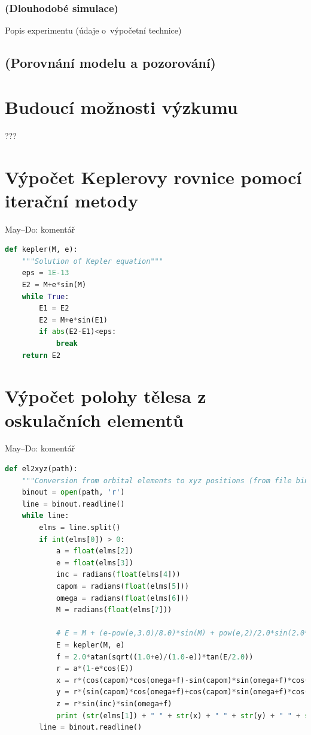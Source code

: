 \documentclass[A4paper, 12pt, oneside]{book}%
\begin{document}
\subsection{(Dlouhodobé simulace)}
Popis experimentu (údaje o~výpočetní technice)
\section{(Porovnání modelu a pozorování)}

\chapter{Budoucí možnosti výzkumu}
???

\newpage

\printbibliography

\begin{appendices}
	\chapter{Výpočet Keplerovy rovnice pomocí iterační metody} \label{app:kepit}
	May--Do: komentář
\begin{lstlisting}[language=Python]
def kepler(M, e):
    """Solution of Kepler equation"""
    eps = 1E-13
    E2 = M+e*sin(M)
    while True:
        E1 = E2
        E2 = M+e*sin(E1)
        if abs(E2-E1)<eps:
            break 
    return E2
\end{lstlisting}
	\chapter{Výpočet polohy tělesa z oskulačních elementů} \label{app:el2xyz}
	May--Do: komentář
	\begin{lstlisting}[language=Python]
def el2xyz(path):
    """Conversion from orbital elements to xyz positions (from file bin.out by script follow2)"""
    binout = open(path, 'r')
    line = binout.readline()
    while line:
        elms = line.split()
        if int(elms[0]) > 0:
            a = float(elms[2])
            e = float(elms[3])
            inc = radians(float(elms[4]))
            capom = radians(float(elms[5]))
            omega = radians(float(elms[6]))
            M = radians(float(elms[7]))
    
            # E = M + (e-pow(e,3.0)/8.0)*sin(M) + pow(e,2)/2.0*sin(2.0*M) + pow(e,3)*3.0/8.0*sin(3.0*M)
            E = kepler(M, e)
            f = 2.0*atan(sqrt((1.0+e)/(1.0-e))*tan(E/2.0))
            r = a*(1-e*cos(E))
            x = r*(cos(capom)*cos(omega+f)-sin(capom)*sin(omega+f)*cos(inc))
            y = r*(sin(capom)*cos(omega+f)+cos(capom)*sin(omega+f)*cos(inc))
            z = r*sin(inc)*sin(omega+f)
            print (str(elms[1]) + " " + str(x) + " " + str(y) + " " + str(z))
        line = binout.readline()
	\end{lstlisting}
\end{appendices}
\end{document}
